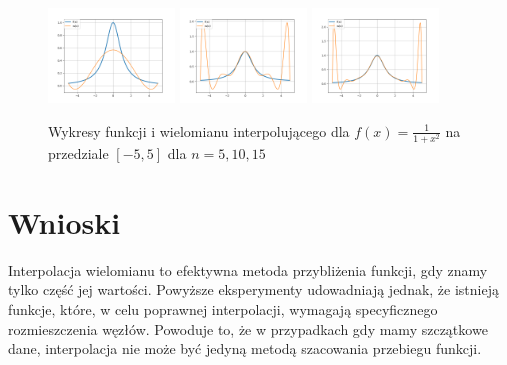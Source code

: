 \documentclass{article}
\begin{document}
\begin{figure}
\includegraphics[width=0.3\textwidth]{plots/6b_5.png}
\includegraphics[width=0.3\textwidth]{plots/6b_10.png}
\includegraphics[width=0.3\textwidth]{plots/6b_15.png}
\caption{Wykresy funkcji i wielomianu interpolującego dla $f(x) = \frac{1}{1+x^2}$ na przedziale $[-5,5]$ dla $n=5,10,15$}
\label{6b}
\end{figure}

\section{Wnioski}

Interpolacja wielomianu to efektywna metoda przybliżenia funkcji, gdy znamy tylko część jej wartości.
Powyższe eksperymenty udowadniają jednak, że istnieją funkcje, które, w celu poprawnej interpolacji, wymagają specyficznego rozmieszczenia węzłów.
Powoduje to, że w przypadkach gdy mamy szczątkowe dane, interpolacja nie może być jedyną metodą szacowania przebiegu funkcji.
\end{document}
